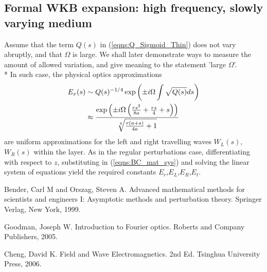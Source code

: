\documentclass[twocolumn,secnumarabic,amssymb, nobibnotes, aps, prd]{revtex4-1}
\begin{document}
\subsection{Formal WKB expansion: high frequency, slowly varying medium}
Assume that the term $Q(s)$ in (\ref{eqns:Q_Sigmoid_Thin}) does not vary abruptly, and that $\Omega$ is large. We shall later demonstrate ways to measure the amount of allowed variation, and give meaning to the statement 'large $\Omega$'. \\*
In such case, the physical optics approximations 
\begin{align}
E_x(s) &\sim Q(s)^{-1/4}\exp \left( \pm i \Omega \int \sqrt{Q(s)}ds\right) \notag \\
& \approx \dfrac{\exp \left(\pm i \Omega  \left(\frac{r s^2}{8 a}+\frac{r s}{4}+s\right) \right)}{\sqrt[4]{\frac{r (a+s)}{4 a}+1}}
\end{align}
are uniform approximations for the left and right travelling waves $W_L(s)$, $W_R(s)$ within the layer. As in the regular perturbations case, differentiating with respect to $z$, substituting in (\ref{eqns:BC_mat_sys}) and solving the linear system of equations yield the required constants $E_r$,$E_L$,$E_R$,$E_t$.   







%

\begin{thebibliography}{2d}

Bender, Carl M and Orszag, Steven A. Advanced mathematical methods for scientists and engineers I: Asymptotic methods and perturbation theory. Springer Verlag, New York, 1999.

Goodman, Joseph W. Introduction to Fourier optics. Roberts and Company Publishers, 2005.

Cheng, David K. Field and Wave Electromagnetics. 2nd Ed. Tsinghua University Press, 2006.



  


\end{thebibliography}


%	
%
%
%

%
%
%
\end{document}
